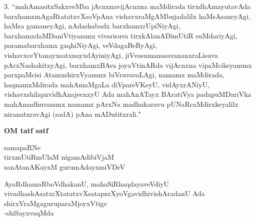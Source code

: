 \begin{artha}
3. ``mahAmasitxSakxveMba jAcnxnavijAcnxna maMdirada tirxdhAmayutavAda barxhamx\-mAgaR\-tatatxvXsoVpAna vishavx\-raMgAMbujadalilx haMsAsaneyAgi, haMsa gamaneyAgi, nAdashabadx barxhamxrUpiNiyAgi, barxhamxdaMDaniVtiyanunx vivarisuva tirxkAlanADimUtiR suMdari\-yAgi, paramabarxhamx gaqhiNiyAgi, veVdagaBeRyAgi, vishavx\-ceYtanayx\-satxnayxdAyiniyAgi, jiVvasumanasavananxraLisuva pArxNashakitxyAgi, barxhamxBAva joyxVtinARda vijAcnxna vipaM\-cike\-yanunx parxpaMcisi AtamxshirxVyanunx biVruvavaLAgi, namamx maMdirada, haqnamxMdirada mahAmaMgaLa diVpa\-reV\-KeyU, vidAyxrANiyU, vishavxshilapxvidhAnajecnxyU Ada mahA\-nATayx BAratiVya padapuMDariVka mahAmadhu\-vanunx namamx pArxNa madhukaravu pUNaRcaMdirxkeyalilx niranatxravAgi (sadA) pAna mADutitxrali."
\end{artha}




\begin{center}
{\bfseries{OM tatf satf}}
\end{center}

\newpage

\thispagestyle{empty}
\begin{center}
{\large samapaRNe\\
tirxmUtiRmUlaM nigamAdibiVjaM\\
sanAtanAKayxM gurumAdayxmiVDeV

\medskip
AyaRdhamaRboVdhakanU, mahaSiRhaqdayaveVdiyU\\
vivadhashAsatxrXtatatxvXsatapxrXyoVgavidhivishAradanU Ada\\
shirxVraMgaguruparaMjoyxVtige\\
\hfill{-shiSayxvaqMda}}
\end{center}
